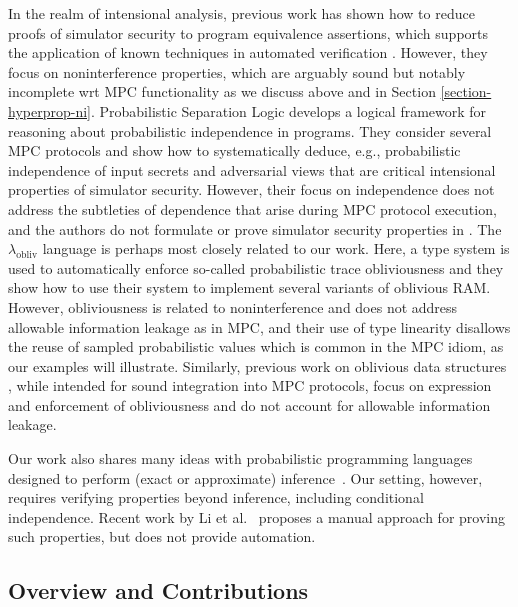 In the realm of intensional analysis, previous work has shown how to
reduce proofs of simulator security to program equivalence assertions,
which supports the application of known techniques in automated verification
\cite{8429300}. However, they focus on noninterference properties,
which are arguably sound but notably incomplete wrt MPC functionality
as we discuss above and in Section
\ref{section-hyperprop-ni}. Probabilistic Separation Logic
\cite{barthe2019probabilistic} develops a logical framework for
reasoning about probabilistic independence in programs.  They consider
several MPC protocols and show how to systematically deduce, e.g.,
probabilistic independence of input secrets and adversarial views that
are critical intensional properties of simulator security.  However,
their focus on independence does not address the subtleties of
dependence that arise during MPC protocol execution, and the authors
do not formulate or prove simulator security properties in
\cite{barthe2019probabilistic}. The $\lambda_{\mathrm{obliv}}$
language \cite{darais2019language} is perhaps most closely related to
our work. Here, a type system is used to automatically enforce
so-called probabilistic trace obliviousness and they show how to use
their system to implement several variants of oblivious RAM. However,
obliviousness is related to noninterference and does not address
allowable information leakage as in MPC, and their use of type
linearity disallows the reuse of sampled probabilistic values which is
common in the MPC idiom, as our examples will illustrate. Similarly,
previous work on oblivious data structures \cite{10.1145/3498713},
while intended for sound integration into MPC protocols, focus on
expression and enforcement of obliviousness and do not account
for allowable information leakage.

Our work also shares many ideas with probabilistic programming
languages designed to perform (exact or approximate)
inference~\cite{holtzen2020scaling, carpenter2017stan, wood2014new,
  bingham2019pyro, albarghouthi2017fairsquare, de2007problog,
  pfeffer2009figaro, saad2021sppl}. Our setting, however, requires
verifying properties beyond inference, including conditional
independence. Recent work by Li et al.~\cite{li2023lilac} proposes a
manual approach for proving such properties, but does not provide
automation.


\subsection{Overview and Contributions}

